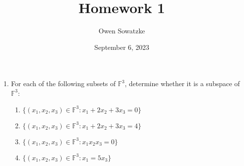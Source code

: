 \documentclass{article}
\title{Homework 1}
\author{Owen Sowatzke}
\date{September 6, 2023}
\begin{document}
	\maketitle
	\begin{enumerate}
		\item For each of the following subsets of $\mathbb{F}^3$, determine whether it is a subspace of $\mathbb{F}^3$:
		\begin{enumerate}
			\item ${\{(x_1, x_2, x_3) \in \mathbb{F}^3 : x_1 + 2x_2 + 3x_3 = 0 \}}$
			\item ${\{(x_1, x_2, x_3) \in \mathbb{F}^3 : x_1 + 2x_2 + 3x_3 = 4 \}}$
			\item ${\{(x_1, x_2, x_3) \in \mathbb{F}^3 : x_1x_2x_3 = 0 \}}$
			\item ${\{(x_1, x_2, x_3) \in \mathbb{F}^3 : x_1 = 5x_3 \}}$
		\end{enumerate}
	\end{enumerate}
\end{document}
